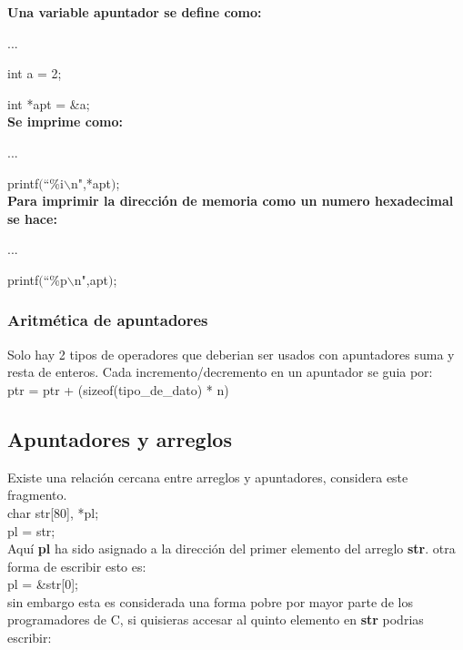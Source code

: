 \documentclass[]{article}
\begin{document}
	\textbf{Una variable apuntador se define como:\\}
	
	...
	
	int a = 2;
	
	int *apt = \&a;\\
	
	\textbf{Se imprime como:\\}
	
	...
	
	printf$($``\%i$\backslash$n",*apt$)$;\\
	
	\textbf{Para imprimir la dirección de memoria como un numero hexadecimal se hace:\\}
	
	...
	
	printf$($``\%p$\backslash$n",apt$)$;\\
	
	
	\subsubsection{Aritmética de apuntadores}
	
	Solo hay 2 tipos de operadores que deberian ser usados con apuntadores suma y resta de enteros. Cada incremento/decremento en un apuntador se guia por:
	\\
	
	ptr = ptr + (sizeof(tipo\_de\_dato) * n)
	
	\subsection{Apuntadores y arreglos}
	
	Existe una relación cercana entre arreglos y apuntadores, considera este fragmento.\\
	
	char str[80], *pl;\\
	
	pl = str;\\
	
	Aquí \textbf{pl} ha sido asignado a la dirección del primer elemento del arreglo \textbf{str}. otra forma de escribir esto es:\\
	
	pl = \&str[0];\\
	
	sin embargo  esta es considerada una forma pobre por mayor parte de los programadores de C, si quisieras accesar al quinto elemento en \textbf{str} podrias escribir:\
	
\end{document}
